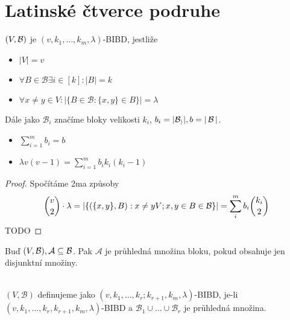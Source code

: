 \section{\texorpdfstring{Latinské čtverce podruhe}{Latinské čtverce podruhe}}

\begin{definition}
    $(V,\operatorname{\mathcal{B}})$ je $(v,k_1,\ldots,k_m,\lambda)$-BIBD, jestliže
    \begin{itemize}
        \item $|V| = v$
        \item $\forall B\in\mathcal{B}\exists i \in[k]: |B|=k$
        \item $\forall x\neq y\in V: |\{B\in\mathcal{B}: \{x,y\}\in B\}|=\lambda$
    \end{itemize}

    Dále jako $\mathcal{B}_i$ značíme bloky velikosti $k_i$, $b_i=|\mathcal{B_i}|, b=|\operatorname{\mathcal{B}}|$.
\end{definition}
\begin{note}
    \begin{itemize}
        \item $\sum_{i=1}^mb_i=b$
        \item $\lambda v(v-1)=\sum_{i=1}^m b_ik_i(k_i-1)$
    \end{itemize}
\end{note}
\begin{proof}
	Spočítáme 2ma způsoby
	\[ \binom{v}{2} \cdot \lambda = |\{ (\{ x, y \}, B): x \ne y V; x, y \in B \in \operatorname{\mathcal{B}} \}| = \sum_i^m b_i \binom{k_i}{2} \]
    TODO
\end{proof}

\begin{definition}
    Buď $(V,\operatorname{\mathcal{B}}), \mathcal{A} \subseteq \operatorname{\mathcal{B}}$.
    Pak $\mathcal{A}$ je průhledná množina bloku, pokud obsahuje jen disjunktní množiny.
\end{definition}
\begin{definition}~\\
    $(V,\mathcal{B})$ definujeme jako $(v,k_1,\ldots,k_r;k_{r+1},k_m,\lambda)$-BIBD, je-li $(v,k_1,\ldots,k_r,k_{r+1},k_m,\lambda)$-BIBD a $\mathcal{B}_1\cup\ldots\cup\mathcal{B}_r$ je průhledná množina.
\end{definition}

